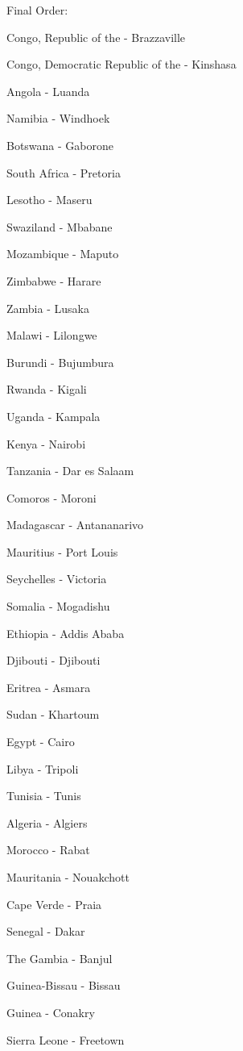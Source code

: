 \documentclass[12pt]{article}
\begin{document}
Final Order:
\begin{multicols}{3}
\tiny\begin{enumerate*}
\item Congo, Republic of the - Brazzaville
\item Congo, Democratic Republic of the - Kinshasa
\item Angola - Luanda
\item Namibia - Windhoek
\item Botswana - Gaborone
\item South Africa - Pretoria
\item Lesotho - Maseru
\item Swaziland - Mbabane
\item Mozambique - Maputo
\item Zimbabwe - Harare
\item Zambia - Lusaka
\item Malawi - Lilongwe
\item Burundi - Bujumbura
\item Rwanda - Kigali
\item Uganda - Kampala
\item Kenya - Nairobi
\item Tanzania - Dar es Salaam
\item Comoros - Moroni
\item Madagascar - Antananarivo
\item Mauritius - Port Louis
\item Seychelles - Victoria
\item Somalia - Mogadishu
\item Ethiopia - Addis Ababa
\item Djibouti - Djibouti
\item Eritrea - Asmara
\item Sudan - Khartoum
\item Egypt - Cairo
\item Libya - Tripoli
\item Tunisia - Tunis
\item Algeria - Algiers
\item Morocco - Rabat
\item Mauritania - Nouakchott
\item Cape Verde - Praia
\item Senegal - Dakar
\item The Gambia - Banjul
\item Guinea-Bissau - Bissau
\item Guinea - Conakry
\item Sierra Leone - Freetown

\end{enumerate*}
\end{multicols}
\end{document}
